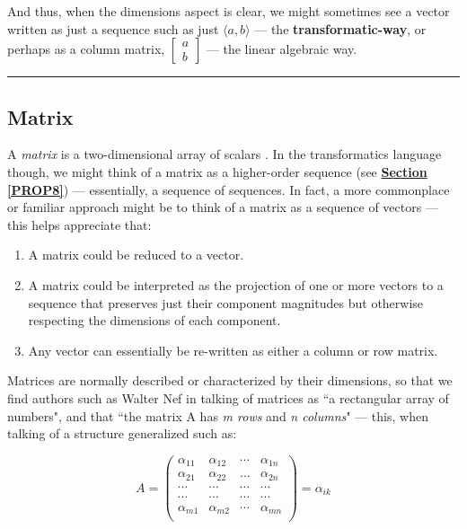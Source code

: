 \documentclass[a4paper, 18pt]{book} %
\begin{document}
\begin{appendices}
And thus, when the dimensions aspect is clear, we might sometimes see a vector written as just a sequence such as just $\langle a, b \rangle$ --- the \textbf{transformatic-way}, or perhaps as a column matrix, $\begin{bmatrix} a \\ b \end{bmatrix}$ --- the linear algebraic way.


\noindent\rule{\textwidth}{0.4pt}


\subsection*{Matrix}

A \emph{matrix} is a two-dimensional array of scalars \cite{copilot_dna_assistant}. In the transformatics language though, we might think of a matrix as a higher-order sequence (see \textbf{\hyperref[PROP8]{Section \ref{PROP8}}}) --- essentially, a sequence of sequences. In fact, a more commonplace or familiar approach might be to think of a matrix as a sequence of vectors --- this helps appreciate that:

\vspace{2em}

\begin{enumerate}
\item A matrix could be reduced to a vector.
\item A matrix could be interpreted as the projection of one or more vectors to a sequence that preserves just their component magnitudes but otherwise respecting the dimensions of each component.
\item Any vector can essentially be re-written as either a column or row matrix.
\end{enumerate}


\vspace{2em}

Matrices are normally described or characterized by their dimensions, so that we find authors such as Walter Nef in \cite{nef1967linear} talking of matrices as ``a rectangular array of numbers", and that ``the matrix A has \textit{m rows} and \textit{n columns}" --- this, when talking of a structure generalized such as:


\[ A = \begin{pmatrix} \alpha_{11} & \alpha_{12} & \cdots & \alpha_{1n} \\  \alpha_{21} & \alpha_{22} & ... & \alpha_{2n} \\  \cdots & \cdots & \cdots & \cdots \\ \cdots & \cdots & \cdots & \cdots \\ \alpha_{m1} & \alpha_{m2} & \cdots & \alpha_{mn} \\ \end{pmatrix} = \alpha_{ik} \]



\end{appendices}
\end{document}

